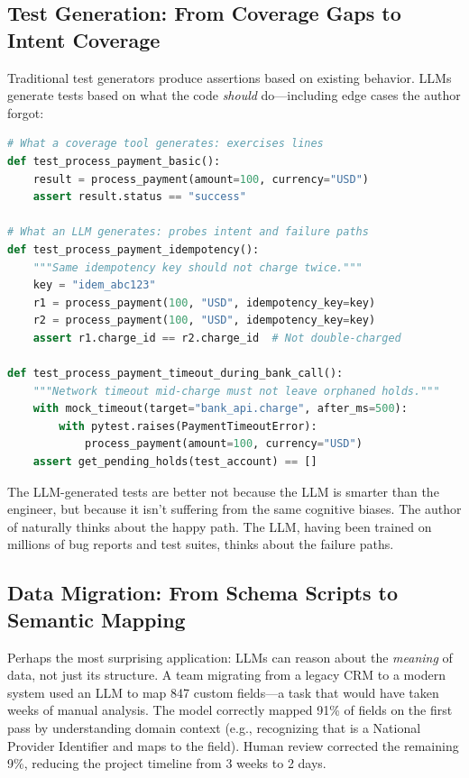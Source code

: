 \subsection{Test Generation: From Coverage Gaps to Intent Coverage}

Traditional test generators produce assertions based on existing behavior. LLMs generate tests based on what the code \emph{should} do---including edge cases the author forgot:

\begin{lstlisting}[language=Python, caption={Intent-driven test generation: LLMs probe failure modes the author didn't consider}]
# What a coverage tool generates: exercises lines
def test_process_payment_basic():
    result = process_payment(amount=100, currency="USD")
    assert result.status == "success"

# What an LLM generates: probes intent and failure paths
def test_process_payment_idempotency():
    """Same idempotency key should not charge twice."""
    key = "idem_abc123"
    r1 = process_payment(100, "USD", idempotency_key=key)
    r2 = process_payment(100, "USD", idempotency_key=key)
    assert r1.charge_id == r2.charge_id  # Not double-charged

def test_process_payment_timeout_during_bank_call():
    """Network timeout mid-charge must not leave orphaned holds."""
    with mock_timeout(target="bank_api.charge", after_ms=500):
        with pytest.raises(PaymentTimeoutError):
            process_payment(amount=100, currency="USD")
    assert get_pending_holds(test_account) == []
\end{lstlisting}

The LLM-generated tests are better not because the LLM is smarter than the engineer, but because it isn't suffering from the same cognitive biases. The author of  naturally thinks about the happy path. The LLM, having been trained on millions of bug reports and test suites, thinks about the failure paths.

\subsection{Data Migration: From Schema Scripts to Semantic Mapping}

Perhaps the most surprising application: LLMs can reason about the \emph{meaning} of data, not just its structure. A team migrating from a legacy CRM to a modern system used an LLM to map 847 custom fields---a task that would have taken weeks of manual analysis. The model correctly mapped 91\% of fields on the first pass by understanding domain context (e.g., recognizing that  is a National Provider Identifier and maps to the  field). Human review corrected the remaining 9\%, reducing the project timeline from 3 weeks to 2 days.

